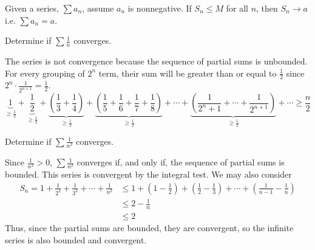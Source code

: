 \begin{thm}{}{}
    Given a series, $\sum a_n$, assume $a_n$ is nonnegative. If $S_n \leq M$ for all $n$, then $S_n \to a$ i.e. $\sum a_n = a$.
\end{thm}

\begin{example}{}{}
    Determine if $\sum \frac{1}{n}$ converges.
    \begin{solution}
        The series is not convergence because the sequence of partial sums is unbounded. For every grouping of $2^n$ term, their sum will be greater than or equal to $\frac{1}{2}$ since $2^{n} \cdot \frac{1}{2^{n+1}} = \frac{1}{2}$. 
        \[
            \underbrace{1}_{\geq \frac{1}{2}}
            +
            \underbrace{\frac{1}{2}}_{\geq \frac{1}{2}}
            +
            \underbrace{\left(\frac13 + \frac14\right)}_{\geq \frac{1}{2}}
            +
            \underbrace{\left(\frac{1}{5} + \frac{1}{6} + \frac{1}{7} + \frac{1}{8}\right)}_{\geq \frac{1}{2}}
            + \cdots + 
            \underbrace{\left(\frac{1}{2^n + 1} + \cdots + \frac{1}{2^{n+1}}\right)}_{\geq \frac{1}{2}} + \cdots \geq \frac{n}{2}
        \]
    \end{solution}
\end{example}

\begin{example}{}{}
    Determine if $\sum \frac{1}{n^2}$ converges.
    \begin{solution}
        Since $\frac{1}{n^2} > 0$, $\sum \frac{1}{n^2}$ converges if, and only if, the sequence of partial sums is bounded. This series is convergent by the integral test. We may also consider 
        \begin{align*}
            S_n = 1 + \frac{1}{2^2} + \frac{1}{3^2} + \cdots + \frac{1}{n^2} &\leq 1 + \left(1 - \frac{1}{2}\right) + \left(\frac{1}{2} - \frac{1}{3}\right) + \cdots + \left(\frac{1}{n-1} - \frac{1}{n}\right) \\
            &\leq 2 - \frac{1}{n} \\
            &\leq 2
        \end{align*}
        Thus, since the partial sums are bounded, they are convergent, so the infinite series is also bounded and convergent. 
    \end{solution}
\end{example}

